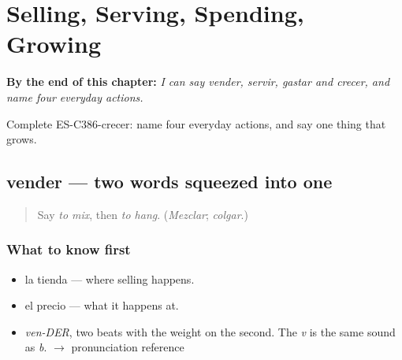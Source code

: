 
\chapter{Selling, Serving, Spending, Growing}
\label{ch:vender-y-servir}

\begin{chapteropening}
\textbf{By the end of this chapter:} \emph{I can say vender, servir, gastar and crecer, and name four everyday actions.}

Complete ES-C386-crecer: name four everyday actions, and say one thing that grows.
\end{chapteropening}

\section[vender]{vender — two words squeezed into one}

\label{lesson:ES-C386-vender}



\begin{quote}
Say \emph{to mix}, then \emph{to hang}. (\emph{Mezclar}; \emph{colgar}.)
\end{quote}

\subsection*{What to know first}
\begin{itemize}
\raggedright
  \item la tienda — where selling happens.
  \item el precio — what it happens at.
\end{itemize}

\begin{sounds}
\begin{itemize}
\raggedright
  \item \emph{ven-DER}, two beats with the weight on the second. The \emph{v} is the same sound as \emph{b}. $\to$ pronunciation reference
\end{itemize}
\end{sounds}

